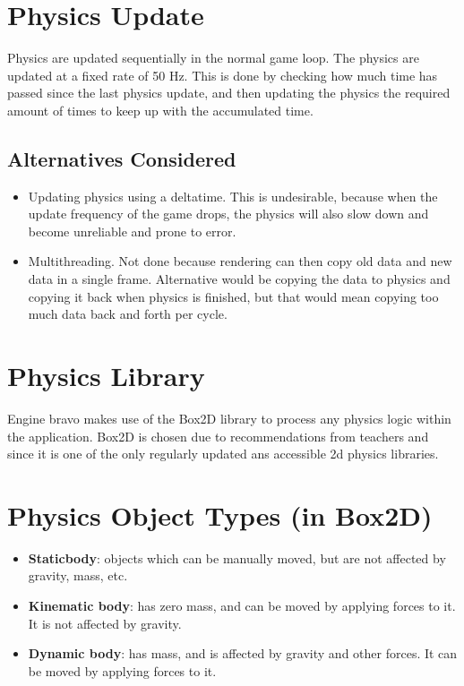 \section{Physics Update}
\label{sec:physics}
Physics are updated sequentially in the normal game loop.
The physics are updated at a fixed rate of 50 Hz. This is done by checking how much time has passed since the last physics update, and then updating the physics the required amount of times to keep up with the accumulated time.

\subsection{Alternatives Considered}
\begin{itemize}
    \item Updating physics using a deltatime. This is undesirable, because when the update frequency of the game drops, the physics will also slow down and become unreliable and prone to error.
    \item Multithreading. Not done because rendering can then copy old data and new data in a single frame. Alternative would be copying the data to physics and copying it back when physics is finished, but that would mean copying too much data back and forth per cycle.
\end{itemize}

\section{Physics Library}
Engine bravo makes use of the Box2D library to process any physics logic within the application. Box2D is chosen due to recommendations from teachers and since it is one of the only regularly updated ans accessible 2d physics libraries.

\section{Physics Object Types (in Box2D)}
\begin{itemize}
    \item \textbf{Staticbody}: objects which can be manually moved, but are not affected by gravity, mass, etc.
    \item \textbf{Kinematic body}: has zero mass, and can be moved by applying forces to it. It is not affected by gravity.
    \item \textbf{Dynamic body}: has mass, and is affected by gravity and other forces. It can be moved by applying forces to it.
\end{itemize}

